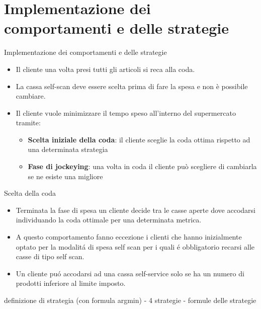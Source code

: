 \section{Implementazione dei comportamenti e delle strategie}





\begin{frame}{Implementazione dei comportamenti e delle strategie}
	\begin{itemize}
		\item Il cliente una volta presi tutti gli articoli si reca alla coda.
		\item La cassa self-scan deve essere scelta prima di fare la spesa e non è possibile cambiare.
		\item Il cliente vuole minimizzare il tempo speso all'interno del supermercato tramite:
		\begin{itemize}
			\item \textbf{Scelta iniziale della coda}: il cliente sceglie la coda ottima rispetto ad una determinata strategia
			\item \textbf{Fase di jockeying}: una volta in coda il cliente può scegliere di cambiarla se ne esiste una migliore
		\end{itemize}
	\end{itemize}
\end{frame}


\begin{frame}{Scelta della coda}
  \centering

  \begin{itemize}
  \item Terminata la fase di spesa un cliente decide tra le casse
    aperte dove accodarsi individuando la coda ottimale per una
    determinata metrica.

  \item A questo comportamento fanno eccezione i clienti che hanno
    inizialmente optato per la modalitá di spesa self scan per i quali
    é obbligatorio recarsi alle casse di tipo self scan.

  \item Un cliente puó accodarsi ad una cassa self-service solo se ha
    un numero di prodotti inferiore al limite imposto.
  \end{itemize}
  
  definizione di strategia (con formula argmin) - 4 strategie -
  formule delle strategie
\end{frame}


